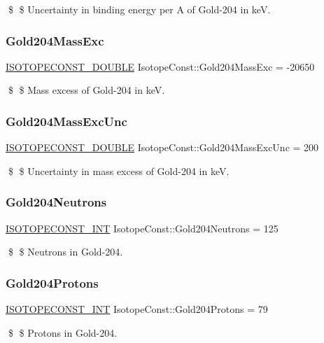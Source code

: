\$ \$ Uncertainty in binding energy per A of Gold-\/204 in keV. \mbox{\label{group___isotope_const-_gold-_au204_ga1d04f4f8687e8c0db63713f09e1e66e5}} 
\subsubsection{\texorpdfstring{Gold204\+Mass\+Exc}{Gold204MassExc}}
{\footnotesize\ttfamily \mbox{\hyperlink{group___isotope_const-_macros_ga8f45a7272ce02c0b4c65c44636ed719a}{I\+S\+O\+T\+O\+P\+E\+C\+O\+N\+S\+T\+\_\+\+D\+O\+U\+B\+LE}} Isotope\+Const\+::\+Gold204\+Mass\+Exc = -\/20650}

\$ \$ Mass excess of Gold-\/204 in keV. \mbox{\label{group___isotope_const-_gold-_au204_gabc42d40e8825f8f6f45f86513fabd00b}} 
\subsubsection{\texorpdfstring{Gold204\+Mass\+Exc\+Unc}{Gold204MassExcUnc}}
{\footnotesize\ttfamily \mbox{\hyperlink{group___isotope_const-_macros_ga8f45a7272ce02c0b4c65c44636ed719a}{I\+S\+O\+T\+O\+P\+E\+C\+O\+N\+S\+T\+\_\+\+D\+O\+U\+B\+LE}} Isotope\+Const\+::\+Gold204\+Mass\+Exc\+Unc = 200}

\$ \$ Uncertainty in mass excess of Gold-\/204 in keV. \mbox{\label{group___isotope_const-_gold-_au204_ga35cfac1af35590493f10d6bda160b97a}} 
\subsubsection{\texorpdfstring{Gold204\+Neutrons}{Gold204Neutrons}}
{\footnotesize\ttfamily \mbox{\hyperlink{group___isotope_const-_macros_ga5f18360b3e99483a35c32d789e62621c}{I\+S\+O\+T\+O\+P\+E\+C\+O\+N\+S\+T\+\_\+\+I\+NT}} Isotope\+Const\+::\+Gold204\+Neutrons = 125}

\$ \$ Neutrons in Gold-\/204. \mbox{\label{group___isotope_const-_gold-_au204_ga631e669367cefea4c8fb3e12d971a54b}} 
\subsubsection{\texorpdfstring{Gold204\+Protons}{Gold204Protons}}
{\footnotesize\ttfamily \mbox{\hyperlink{group___isotope_const-_macros_ga5f18360b3e99483a35c32d789e62621c}{I\+S\+O\+T\+O\+P\+E\+C\+O\+N\+S\+T\+\_\+\+I\+NT}} Isotope\+Const\+::\+Gold204\+Protons = 79}

\$ \$ Protons in Gold-\/204. 